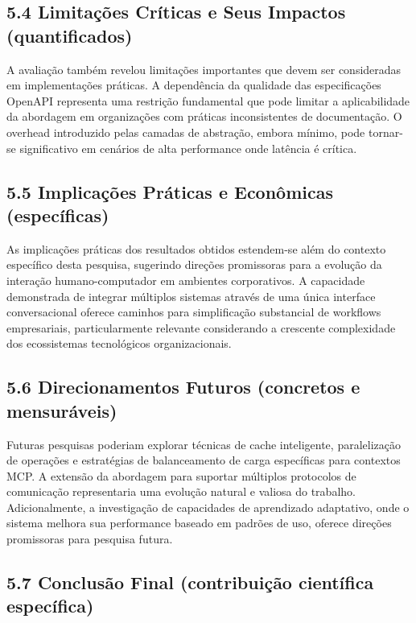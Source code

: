 \documentclass[
]{article}
\begin{document}
\subsection{5.4 Limitações Críticas e Seus Impactos
(quantificados)}\label{limitauxe7uxf5es-cruxedticas-e-seus-impactos-quantificados}

A avaliação também revelou limitações importantes que devem ser
consideradas em implementações práticas. A dependência da qualidade das
especificações OpenAPI representa uma restrição fundamental que pode
limitar a aplicabilidade da abordagem em organizações com práticas
inconsistentes de documentação. O overhead introduzido pelas camadas de
abstração, embora mínimo, pode tornar-se significativo em cenários de
alta performance onde latência é crítica.

\subsection{5.5 Implicações Práticas e Econômicas
(específicas)}\label{implicauxe7uxf5es-pruxe1ticas-e-econuxf4micas-especuxedficas}

As implicações práticas dos resultados obtidos estendem-se além do
contexto específico desta pesquisa, sugerindo direções promissoras para
a evolução da interação humano-computador em ambientes corporativos. A
capacidade demonstrada de integrar múltiplos sistemas através de uma
única interface conversacional oferece caminhos para simplificação
substancial de workflows empresariais, particularmente relevante
considerando a crescente complexidade dos ecossistemas tecnológicos
organizacionais.

\subsection{5.6 Direcionamentos Futuros (concretos e
mensuráveis)}\label{direcionamentos-futuros-concretos-e-mensuruxe1veis}

Futuras pesquisas poderiam explorar técnicas de cache inteligente,
paralelização de operações e estratégias de balanceamento de carga
específicas para contextos MCP. A extensão da abordagem para suportar
múltiplos protocolos de comunicação representaria uma evolução natural e
valiosa do trabalho. Adicionalmente, a investigação de capacidades de
aprendizado adaptativo, onde o sistema melhora sua performance baseado
em padrões de uso, oferece direções promissoras para pesquisa futura.

\subsection{5.7 Conclusão Final (contribuição científica
específica)}\label{conclusuxe3o-final-contribuiuxe7uxe3o-cientuxedfica-especuxedfica}
\end{document}
